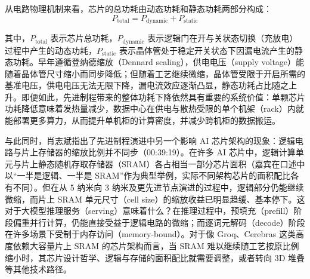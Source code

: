 \documentclass[UTF8,a4paper,11pt,fontset=fandol]{ctexart}
\begin{document}
从电路物理机制来看，芯片的总功耗由动态功耗和静态功耗两部分构成：
\[
P_{\text{total}} = P_{\text{dynamic}} + P_{\text{static}}
\]

其中，\(P_{\text{total}}\) 表示芯片总功耗，\(P_{\text{dynamic}}\) 表示逻辑门在开与关状态切换（充放电）过程中产生的动态功耗，\(P_{\text{static}}\) 表示晶体管处于稳定开关状态下因漏电流产生的静态功耗。早年遵循登纳德缩放（Dennard scaling），供电电压（supply voltage）能随着晶体管尺寸缩小而同步降低；但随着工艺继续微缩，晶体管受限于开启所需的基准电压，供电电压无法无限下降，漏电流效应逐渐凸显，静态功耗占比随之上升。即便如此，先进制程带来的整体功耗下降依然具有重要的系统价值：单颗芯片功耗降低意味着发热量减少，数据中心在供电与散热受限的单个机架（rack）内就能部署更多算力，从而提升单机柜的计算密度，并减少跨机柜的数据搬运。

与此同时，肖志斌指出了先进制程演进中另一个影响 AI 芯片架构的现象：逻辑电路与片上存储器的缩放比例并不同步（00:39:19）。在许多 AI 芯片中，逻辑计算单元与片上静态随机存取存储器（SRAM）各占相当一部分芯片面积（嘉宾在口述中以“一半是逻辑、一半是 SRAM”作为典型举例，实际不同架构芯片的面积配比各有不同）。但在从 5 纳米向 3 纳米及更先进节点演进的过程中，逻辑部分仍能继续微缩，而片上 SRAM 单元尺寸（cell size）的缩放收益已明显趋缓、基本停下。这对于大模型推理服务（serving）意味着什么？在推理过程中，预填充（prefill）阶段偏重并行计算，仍能直接受益于逻辑电路的微缩；而逐词元解码（decode）阶段在许多场景下受制于内存访问（memory-bound）。对于像 Groq、Cerebras 这类高度依赖大容量片上 SRAM 的芯片架构而言，当 SRAM 难以继续随工艺按原比例缩小时，其芯片设计哲学、逻辑与存储的面积配比就需要调整，或者转向 3D 堆叠等其他技术路径。
\end{document}
